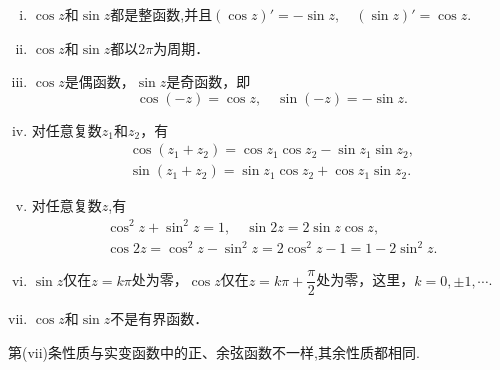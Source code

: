 \documentclass[../../main.tex]{subfiles}
\begin{document}
\begin{proposition}[三角函数的性质]\label{proposition:三角函数的性质}
\begin{enumerate}[(i)]
\item $\cos z$和$\sin z$都是整函数,并且$(\cos z)' = -\sin z,
\quad
(\sin z)' = \cos z.$

\item $\cos z$和$\sin z$都以$2\pi$为周期．

\item $\cos z$是偶函数，$\sin z$是奇函数，即
\[
\cos(-z) = \cos z,
\quad
\sin(-z) = -\sin z.
\]

\item 对任意复数$z_1$和$z_2$，有
\begin{align}
\cos(z_1 + z_2) = \cos z_1 \cos z_2 - \sin z_1 \sin z_2, \label{equation----2.2.2.2.1}
\\
\sin(z_1 + z_2) = \sin z_1 \cos z_2 + \cos z_1 \sin z_2.
\label{equation----2.2.2.2.2} 
\end{align}

\item 对任意复数$z$,有
\begin{gather*}
\cos^2 z + \sin^2 z = 1,
\quad
\sin 2z = 2\sin z \cos z,
\\
\cos 2z=\cos ^2z-\sin ^2z=2\cos ^2z-1=1-2\sin ^2z.
\end{gather*}

\item $\sin z$仅在$z = k\pi$处为零，$\cos z$仅在$z = k\pi + \dfrac{\pi}{2}$处为零，这里，$k = 0, \pm 1, \cdots$.

\item $\cos z$和$\sin z$不是有界函数．
\end{enumerate}
\end{proposition}
\begin{remark}
第(vii)条性质与实变函数中的正、余弦函数不一样,其余性质都相同.
\end{remark}
\end{document}
